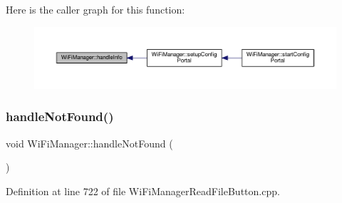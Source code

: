 Here is the caller graph for this function\+:\nopagebreak
\begin{figure}[H]
\begin{center}
\leavevmode
\includegraphics[width=350pt]{d4/dc8/class_wi_fi_manager_ac35e46661f8a209d84bba62d9aa43a35_icgraph}
\end{center}
\end{figure}
\mbox{\label{class_wi_fi_manager_a7d01f7de3e4b76acdabffac79fa3d0ab}} 
\subsubsection{\texorpdfstring{handle\+Not\+Found()}{handleNotFound()}}
{\footnotesize\ttfamily void Wi\+Fi\+Manager\+::handle\+Not\+Found (\begin{DoxyParamCaption}{ }\end{DoxyParamCaption})\hspace{0.3cm}{\ttfamily [private]}}



Definition at line 722 of file Wi\+Fi\+Manager\+Read\+File\+Button.\+cpp.


